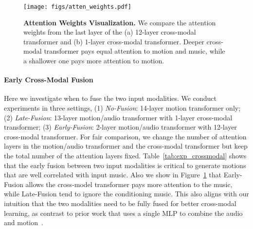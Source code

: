 \begin{table}[t]
\vspace{-5mm}
\midsepdefault
\caption{\textbf{Ablation Study on Attention and Supervision Mechanism.} Causal-attention shift-by-1 supervision tends to generate freezing motions in the long-term. While Full-attention supervised more future frames boost the ability of generating more realistic dance motions. }
\label{tab:exp_decoder}
\vspace{-2mm}
\end{table} \begin{figure}[t]
\centering
\texttt{[image: figs/atten\_weights.pdf]}
\caption{\textbf{Attention Weights Visualization.} We compare the attention weights from the last layer of the (a) 12-layer cross-modal transformer and (b) 1-layer cross-modal transformer. Deeper cross-modal transformer pays equal attention to motion and music, while a shallower one pays more attention to motion.
}
\label{fig:atten_weights}
\vspace{-4mm}
\end{figure} 
\vspace{-3mm}
\paragraph{Early Cross-Modal Fusion} 
Here we investigate when to fuse the two input modalities.
We conduct experiments in three settings, (1) \emph{No-Fusion}: 14-layer motion transformer only; (2) \emph{Late-Fusion}: 13-layer motion/audio transformer with 1-layer cross-modal transformer; (3) \emph{Early-Fusion}: 2-layer motion/audio transformer with 12-layer cross-modal transformer. 
For fair comparison, we change the number of attention layers in the motion/audio transformer and the cross-modal transformer but keep the total number of the attention layers fixed.
Table~\ref{tab:exp_crossmodal} shows that the early fusion between two input modalities is critical to generate motions that are well correlated with input music. Also we show in Figure~\ref{fig:atten_weights} that Early-Fusion allows the cross-model transformer pays more attention to the music, while Late-Fusion tend to ignore the conditioning music.
This also aligns with our intuition that the two modalities need to be fully fused for better cross-modal learning, as contrast to prior work that uses a single MLP to combine the audio and motion~\cite{li2020learning}.



